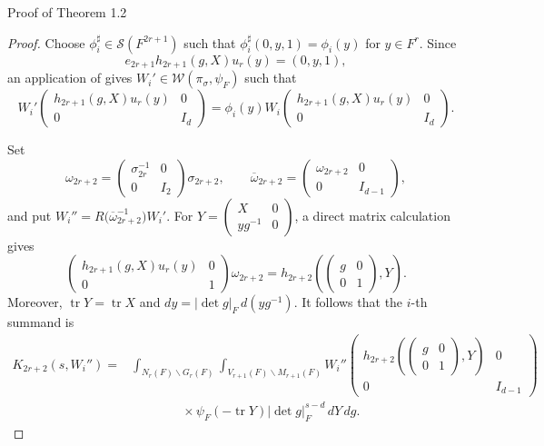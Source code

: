 \documentclass[12pt,reqno]{amsart}
\numberwithin{equation}{section}%
\numberwithin{equation}{subsection}
\theoremstyle{definition}
\theoremstyle{remark}
\begin{document}
\begin{section}{Proof of Theorem 1.2}
\begin{proof}
Choose $\phi_i^\sharp\in\mathcal{S}(F^{2r+1})$ such that $\phi_i^\sharp(0,y,1)=\phi_i(y)$ for $y\in F^r$. Since 
$$e_{2r+1}h_{2r+1}(g,X)u_r(y)=(0,y,1),$$ an application of \cite[Proposition~6.1]{Jac2009} gives $W_i'\in\mathcal{W}(\pi_\sigma,\psi_F)$ such that 
\[
  W_i'\begin{pmatrix} h_{2r+1}(g,X)u_r(y)&0\\ 0&I_{d} \end{pmatrix}= \phi_i(y)W_i\begin{pmatrix} h_{2r+1}(g,X)u_r(y)&0\\ 0&I_{d} \end{pmatrix}.
\]

Set
\[
  \omega_{2r+2} = \begin{pmatrix} \sigma_{2r}^{-1}&0\\ 0&I_2 \end{pmatrix} \sigma_{2r+2}, \qquad \overline{\omega}_{2r+2} = \begin{pmatrix} \omega_{2r+2}&0\\ 0&I_{d-1} \end{pmatrix},
\]
and put $W_i''=R\bigl(\overline{\omega}_{2r+2}^{-1}\bigr)W_i'$. For $Y = \left(\begin{smallmatrix} X&0\\ yg^{-1}&0 \end{smallmatrix}\right)$, a direct matrix calculation gives
\[
  \begin{pmatrix} h_{2r+1}(g,X)u_r(y)&0\\ 0&1 \end{pmatrix} \omega_{2r+2} = h_{2r+2} \left( \begin{pmatrix} g&0\\ 0&1 \end{pmatrix},Y \right).
\]
Moreover, $\operatorname{tr}Y=\operatorname{tr}X$ and $dy=|\det g|_F\,d(yg^{-1})$. It follows that the $i$-th summand is
\[
  \begin{aligned}
    K_{2r+2}(s,W_i'') ={}& \int_{N_r(F)\backslash G_r(F)} \int_{V_{r+1}(F)\backslash M_{r+1}(F)} W_i''\begin{pmatrix} h_{2r+2}\left( \begin{pmatrix}g&0\\0&1\end{pmatrix},Y \right)&0\\ 0&I_{d-1} \end{pmatrix}\\
    &\qquad\qquad\times \psi_F(-\operatorname{tr}Y) |\det g|_F^{s-d}\,dY\,dg.
  \end{aligned}
\]


\end{proof}
\end{section}
\end{document}
